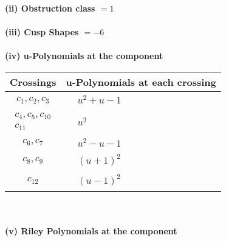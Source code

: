 \documentclass[1p]{elsarticle_modified}
\theoremstyle{definition}
\begin{document}
\flushleft \textbf{(ii) Obstruction class $= 1$}\\~\\
\flushleft \textbf{(iii) Cusp Shapes $= -6$}\\~\\
\newpage\renewcommand{\arraystretch}{1}
\flushleft \textbf{(iv) u-Polynomials at the component}\newline \\
\begin{tabular}{m{50pt}|m{274pt}}
Crossings & \hspace{64pt}u-Polynomials at each crossing \\
\hline $$\begin{aligned}c_{1},c_{2},c_{3}\end{aligned}$$&$\begin{aligned}
&u^2+u-1
\end{aligned}$\\
\hline $$\begin{aligned}c_{4},c_{5},c_{10}\\c_{11}\end{aligned}$$&$\begin{aligned}
&u^2
\end{aligned}$\\
\hline $$\begin{aligned}c_{6},c_{7}\end{aligned}$$&$\begin{aligned}
&u^2- u-1
\end{aligned}$\\
\hline $$\begin{aligned}c_{8},c_{9}\end{aligned}$$&$\begin{aligned}
&(u+1)^2
\end{aligned}$\\
\hline $$\begin{aligned}c_{12}\end{aligned}$$&$\begin{aligned}
&(u-1)^2
\end{aligned}$\\
\hline
\end{tabular}\\~\\
\newpage\renewcommand{\arraystretch}{1}
\flushleft \textbf{(v) Riley Polynomials at the component}\newline \\
\end{document}
